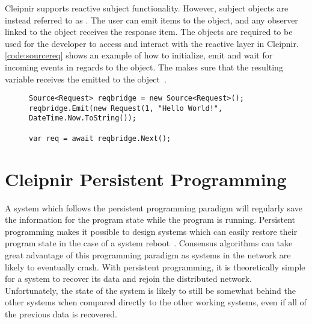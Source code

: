 \iffalse
Cleipnir supports reactive subjects, however they are instead known as \code{Sources}. The user can emit items to the \code{Source} object, and any observer linked to it will receive the response item. The \code{Source} object needs to be used in order for the developer to access and interact with the reactive layer in Cleipnir. \autoref{code:sourcereq} shows an example on how to initialize, emit and wait for incoming events in regards to the \code{Source} object. The \code{await reqbridge.Next()} makes sure that the resulting variable \code{req} receives the \code{Request} emitted to the \code{Source} object~\cite[p.~8]{PAPER:PaxosCleipnir}.
\fi

Cleipnir supports reactive subject functionality. However, subject objects are instead referred to as . The user can emit items to the  object, and any observer linked to the  object receives the response item. The  objects are required to be used for the developer to access and interact with the reactive layer in Cleipnir. \autoref{code:sourcereq} shows an example of how to initialize, emit and wait for incoming events in regards to the  object. The  makes sure that the resulting variable  receives the  emitted to the  object~\cite[p.~8]{PAPER:PaxosCleipnir}.

\begin{figure}[H]
	\centering
	\begin{lstlisting}[label = code:sourcereq, caption=Source object example, captionpos=b, basicstyle=\scriptsize]
Source<Request> reqbridge = new Source<Request>();
reqbridge.Emit(new Request(1, "Hello World!", DateTime.Now.ToString());

var req = await reqbridge.Next();
	\end{lstlisting}
\end{figure}

\iffalse
\section{Cleipnir Persistent Programming}
\label{section:PersistentProgramming}
A system which follows the persistent programming paradigm will regularly save the information for the program state while the program is running. Persistent programming makes it possible to design systems which can easily restore their program state in the case of a system reboot~\cites{DOC:Cleipnir}[p.~6]{PAPER:PaxosCleipnir}. Consensus algorithms can take great advantage of this programming paradigm as systems in the network are likely to eventually crash. With persistent programming, it is theoretically simple for a system to recover its data and rejoin the distributed network. Unfortunately, the state of the system is likely to still be somewhat behind the other systems when compared directly to the other working systems, even if all of the previous data is recovered. 

